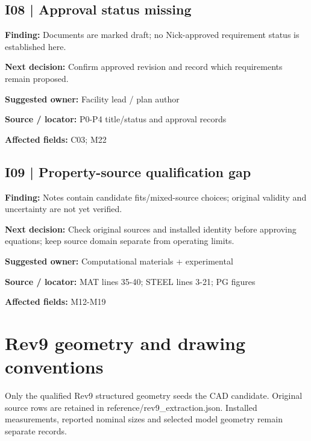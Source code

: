 \documentclass[11pt]{article}
\begin{document}
\begin{minipage}{\textwidth}\small\setlength{\parskip}{2pt}
\subsection*{I08 | Approval status missing}
\textbf{Finding:} Documents are marked draft; no Nick-approved requirement status is established here.\par
\textbf{Next decision:} Confirm approved revision and record which requirements remain proposed.\par
\textbf{Suggested owner:} Facility lead / plan author\par
\textbf{Source / locator:} P0-P4 title/status and approval records\par
\textbf{Affected fields:} C03; M22\par
\end{minipage}\par\vspace{8pt}
\begin{minipage}{\textwidth}\small\setlength{\parskip}{2pt}
\subsection*{I09 | Property-source qualification gap}
\textbf{Finding:} Notes contain candidate fits/mixed-source choices; original validity and uncertainty are not yet verified.\par
\textbf{Next decision:} Check original sources and installed identity before approving equations; keep source domain separate from operating limits.\par
\textbf{Suggested owner:} Computational materials + experimental\par
\textbf{Source / locator:} MAT lines 35-40; STEEL lines 3-21; PG figures\par
\textbf{Affected fields:} M12-M19\par
\end{minipage}\par\vspace{8pt}
\clearpage\section{Rev9 geometry and drawing conventions}
Only the qualified Rev9 structured geometry seeds the CAD candidate. Original source rows are retained in reference/rev9\_extraction.json. Installed measurements, reported nominal sizes and selected model geometry remain separate records.
\end{document}
